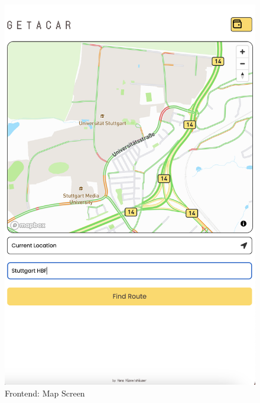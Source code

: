 \begin{figure}[h]
\begin{minipage}{0.45\linewidth}
        \includegraphics[width=\linewidth]{data/ffss/2.png}
        \caption{Frontend: Map Screen}
        \label{fig:MapScreen}
    \end{minipage}
    
\end{figure}



